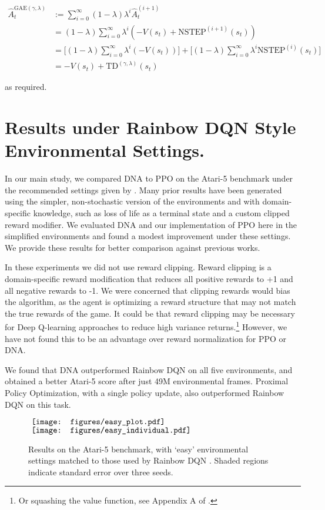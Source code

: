 \documentclass{article}
\begin{document}
\begin{align}
    \hat{A}_t^{\text{GAE}(\gamma, \lambda)} &:= \sum^{\infty}_{i=0} (1-\lambda)  \lambda^i \hat{A}_t^{(i+1)} \\ 
    &= (1-\lambda) \sum^{\infty}_{i=0} \lambda^i (-V(s_t) + \text{NSTEP}^{(i+1)}(s_t)) \\
    &= \Bigg[ (1-\lambda) \sum^{\infty}_{i=0} \lambda^i (-V(s_t)) \Bigg] +  \Bigg[ (1-\lambda) \sum^{\infty}_{i=0} \lambda^i \text{NSTEP}^{(i)}(s_t) \Bigg] \\
    &= -V(s_t) + \text{TD}^{(\gamma, \lambda)}(s_t)  
\end{align}

as required.

\section{Results under Rainbow DQN Style Environmental Settings.}
\label{app:easy}

In our main study, we compared DNA to PPO on the Atari-5 benchmark under the recommended settings given by \cite{machado2018revisiting}. Many prior results have been generated using the simpler, non-stochastic version of the environments and with domain-specific knowledge, such as loss of life as a terminal state and a custom clipped reward modifier. We evaluated DNA and our implementation of PPO here in the simplified environments and found a modest improvement under these settings. We provide these results for better comparison against previous works.

In these experiments we did not use reward clipping. Reward clipping is a domain-specific reward modification that reduces all positive rewards to +1 and all negative rewards to -1. We were concerned that clipping rewards would bias the algorithm, as the agent is optimizing a reward structure that may not match the true rewards of the game. It could be that reward clipping may be necessary for Deep Q-learning approaches to reduce high variance returns.\footnote{Or squashing the value function, see Appendix A of \cite{badia2020agent57}.} However, we have not found this to be an advantage over reward normalization for PPO or DNA. 

We found that DNA outperformed Rainbow DQN on all five environments, and obtained a better Atari-5 score after just 49M environmental frames. Proximal Policy Optimization, with a single policy update, also outperformed Rainbow DQN on this task.

\begin{figure}[H]
    \centering
    $\vcenter{\hbox{
    \texttt{[image: figures/easy\_plot.pdf]}}}$
    $\vcenter{\hbox{
    \texttt{[image: figures/easy\_individual.pdf]}
    }}$
    \caption{Results on the Atari-5 benchmark, with `easy' environmental settings matched to those used by Rainbow DQN \cite{hessel2018rainbow}. Shaded regions indicate standard error over three seeds.}
    \label{fig:easy_plot}
\end{figure}
\end{document}

